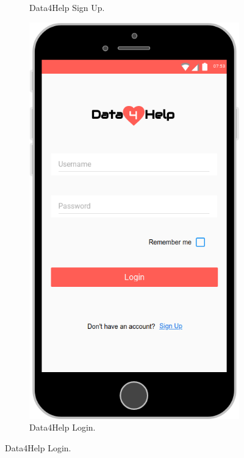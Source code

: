 \begin{figure}[ht]
\begin{subfigure}[t]{0.38\linewidth}
        \caption{Data4Help Sign Up.}
    \end{subfigure} \hfil \hfil \hfil
    \begin{subfigure}[t]{0.38\linewidth}
        \includegraphics[width=\linewidth]{images/Mock-up/Login_Page.png}
        \caption{Data4Help Login.}
    \end{subfigure}
\end{figure}

